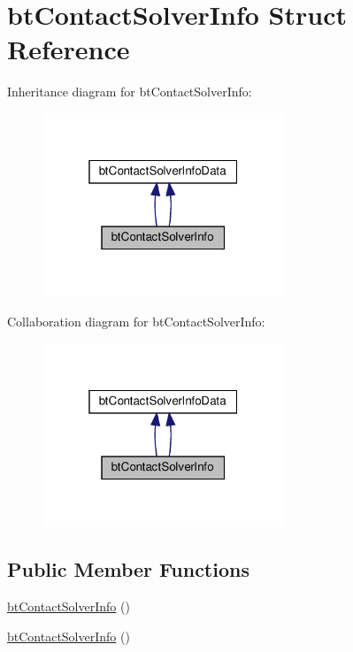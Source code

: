 \hypertarget{structbtContactSolverInfo}{}\section{bt\+Contact\+Solver\+Info Struct Reference}
\label{structbtContactSolverInfo}


Inheritance diagram for bt\+Contact\+Solver\+Info\+:
\nopagebreak
\begin{figure}[H]
\begin{center}
\leavevmode
\includegraphics[width=205pt]{structbtContactSolverInfo__inherit__graph}
\end{center}
\end{figure}


Collaboration diagram for bt\+Contact\+Solver\+Info\+:
\nopagebreak
\begin{figure}[H]
\begin{center}
\leavevmode
\includegraphics[width=205pt]{structbtContactSolverInfo__coll__graph}
\end{center}
\end{figure}
\subsection*{Public Member Functions}
\begin{DoxyCompactItemize}
\item 
\hyperlink{structbtContactSolverInfo_a233666cc8ab8288ae84b22145b41d76e}{bt\+Contact\+Solver\+Info} ()
\item 
\hyperlink{structbtContactSolverInfo_a233666cc8ab8288ae84b22145b41d76e}{bt\+Contact\+Solver\+Info} ()
\end{DoxyCompactItemize}
